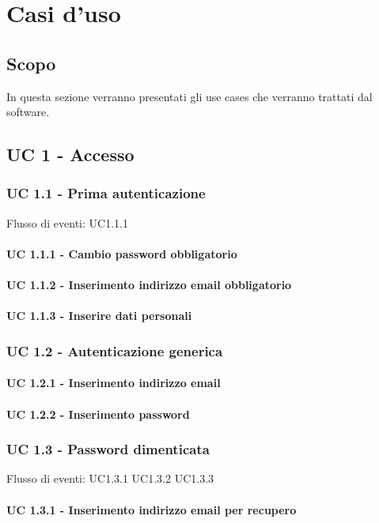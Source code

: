 \section{Casi d'uso}
\subsection{Scopo}
In questa sezione verranno presentati gli use cases che verranno trattati dal software.
\subsection{UC 1 - Accesso}
    \subsubsection{UC 1.1 - Prima autenticazione}
    Flusso di eventi: UC1.1.1
        \paragraph{UC 1.1.1 - Cambio password obbligatorio}
        \paragraph{UC 1.1.2 - Inserimento indirizzo email obbligatorio}
        \paragraph{UC 1.1.3 - Inserire dati personali}
    \subsubsection{UC 1.2 - Autenticazione generica}
        \paragraph{UC 1.2.1 - Inserimento indirizzo email}
        \paragraph{UC 1.2.2 - Inserimento password}
    \subsubsection{UC 1.3 - Password dimenticata}
    Flusso di eventi: UC1.3.1 UC1.3.2 UC1.3.3
        \paragraph{UC 1.3.1 - Inserimento indirizzo email per recupero}
